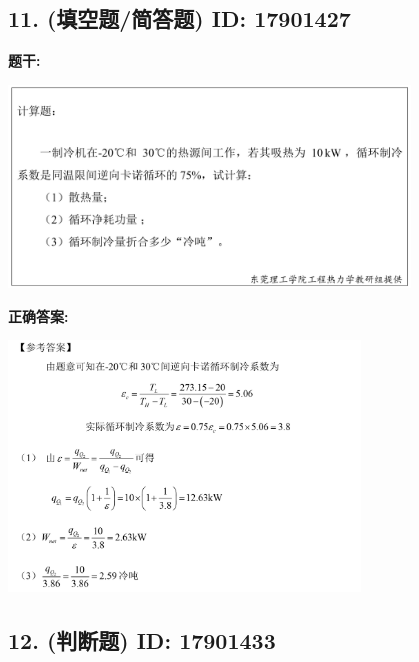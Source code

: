 \documentclass[12pt]{article}
\begin{document}
\vspace{0.5em}\hrulefill\vspace{1em}

\subsection*{11. (填空题/简答题) \small ID: 17901427}

\textbf{题干:}


\begin{center}\includegraphics[width=0.8\textwidth, height=0.25\textheight, keepaspectratio]{question_11_17901427/title_img_1.png}\end{center}

\textbf{正确答案:}

\begin{center}\includegraphics[width=0.7\textwidth, height=0.2\textheight, keepaspectratio]{question_11_17901427/correct_answer_1_img_1.png}\end{center}

\vspace{0.5em}\hrulefill\vspace{1em}

\subsection*{12. (判断题) \small ID: 17901433}
\end{document}
